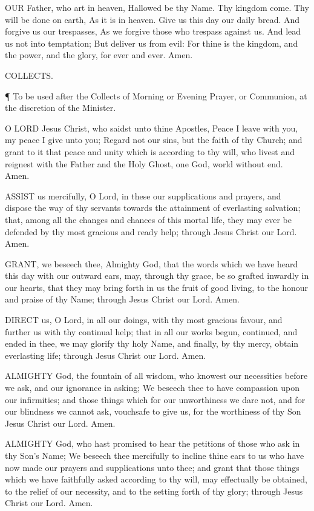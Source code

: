 OUR Father, who art in heaven, Hallowed be thy Name. Thy kingdom come. Thy will be done on earth, As it is in heaven. Give us this day our daily bread. And forgive us our trespasses, As we forgive those who trespass against us. And lead us not into temptation; But deliver us from evil: For thine is the kingdom, and the power, and the glory, for ever and ever. Amen.
 

 

 
COLLECTS.

¶ To be used after the Collects of Morning or Evening Prayer, or Communion, at the discretion of the Minister.
 

O LORD Jesus Christ, who saidst unto thine Apostles, Peace I leave with you, my peace I give unto you; Regard not our sins, but the faith of thy Church; and grant to it that peace and unity which is according to thy will, who livest and reignest with the Father and the Holy Ghost, one God, world without end. Amen.

ASSIST us mercifully, O Lord, in these our supplications and prayers, and dispose the way of thy servants towards the attainment of everlasting salvation; that, among all the changes and chances of this mortal life, they may ever be defended by thy most gracious and ready help; through Jesus Christ our Lord. Amen.

GRANT, we beseech thee, Almighty God, that the words which we have heard this day with our outward ears, may, through thy grace, be so grafted inwardly in our hearts, that they may bring forth in us the fruit of good living, to the honour and praise of thy Name; through Jesus Christ our Lord. Amen.

DIRECT us, O Lord, in all our doings, with thy most gracious favour, and further us with thy continual help; that in all our works begun, continued, and ended in thee, we may glorify thy holy Name, and finally, by thy mercy, obtain everlasting life; through Jesus Christ our Lord. Amen.

ALMIGHTY God, the fountain of all wisdom, who knowest our necessities before we ask, and our ignorance in asking; We beseech thee to have compassion upon our infirmities; and those things which for our unworthiness we dare not, and for our blindness we cannot ask, vouchsafe to give us, for the worthiness of thy Son Jesus Christ our Lord. Amen.

ALMIGHTY God, who hast promised to hear the petitions of those who ask in thy Son’s Name; We beseech thee mercifully to incline thine ears to us who have now made our prayers and supplications unto thee; and grant that those things which we have faithfully asked according to thy will, may effectually be obtained, to the relief of our necessity, and to the setting forth of thy glory; through Jesus Christ our Lord. Amen.

